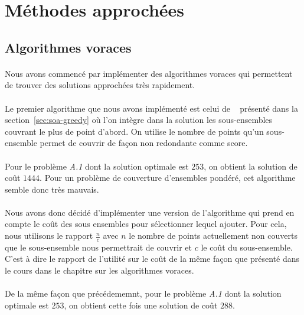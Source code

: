 \documentclass[12pt,letterpaper,twoside]{article}
\begin{document}
	\section{Méthodes approchées}
		\subsection{Algorithmes voraces}\label{sec:approx-greedy}
			\paragraph*{}
				Nous avons commencé par implémenter des algorithmes voraces qui permettent de trouver des solutions approchées très rapidement.
			\paragraph*{}
				Le premier algorithme que nous avons implémenté est celui de
				\citeauthor{Johnson:1973:AAC:800125.804034}~\cite{Johnson:1973:AAC:800125.804034} présenté dans la section~\ref{sec:soa-greedy}
				où l'on intègre dans la solution les sous-ensembles couvrant le plus de point d'abord.
				On utilise le nombre de points qu'un sous-ensemble permet de couvrir de façon non redondante comme score.
			\paragraph*{}
				Pour le problème \emph{A.1} dont la solution optimale est \(253\), on obtient la solution de coût \(1444\).
				Pour un problème de couverture d'ensembles pondéré, cet algorithme semble donc très mauvais.
			\paragraph*{}
				Nous avons donc décidé d'implémenter une version de l'algorithme qui prend en compte le coût des sous ensembles pour
				sélectionner lequel ajouter.
				Pour cela, nous utilisons le rapport \(\frac{n}{c}\) avec \(n\) le nombre de points actuellement non couverts que le
				sous-ensemble nous permettrait de couvrir et \(c\) le coût du sous-ensemble. C'est à dire le rapport de l'utilité sur
				le coût de la même façon que présenté dans le cours dans le chapitre sur les algorithmes voraces.
			\paragraph*{}
				De la même façon que précédememnt, pour le problème \emph{A.1} dont la solution optimale est \(253\), on obtient cette fois
				une solution de coût \(288\).
\end{document}

